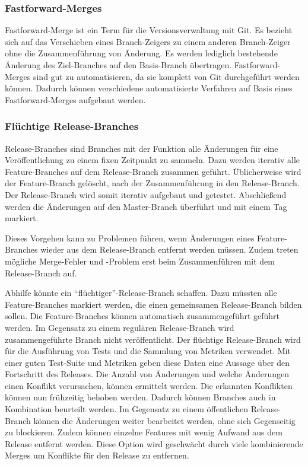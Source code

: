 \subsubsection{Fastforward-Merges}

Fastforward-Merge ist ein Term für die Versionsverwaltung mit Git. Es bezieht sich auf das Verschieben eines Branch-Zeigers zu einem anderen Branch-Zeiger ohne die Zusammenführung von Änderung. Es werden lediglich bestehende Änderung des Ziel-Branches auf den Basis-Branch übertragen.
Fastforward-Merges sind gut zu automatisieren, da sie komplett von Git durchgeführt werden können. Dadurch können verschiedene automatisierte Verfahren auf Basis eines Fastforward-Merges aufgebaut werden.

\subsubsection{Flüchtige Release-Branches}

Release-Branches sind Branches mit der Funktion alle Änderungen für eine Veröffentlichung zu einem fixen Zeitpunkt zu sammeln. Dazu werden iterativ alle Feature-Branches auf dem Release-Branch zusammen geführt. Üblicherweise wird der Feature-Branch gelöscht, nach der Zusammenführung in den Release-Branch. Der Release-Branch wird somit iterativ aufgebaut und getestet. Abschließend werden die Änderungen auf den Master-Branch überführt und mit einem Tag markiert.

Dieses Vorgehen kann zu Problemen führen, wenn Änderungen eines Feature-Branches wieder aus dem Release-Branch entfernt werden müssen. Zudem treten mögliche Merge-Fehler und -Problem erst beim Zusammenführen mit dem Release-Branch auf.

Abhilfe könnte ein ``flüchtiger''-Release-Branch schaffen. Dazu müssten alle Feature-Branches markiert werden, die einen gemeinsamen Release-Branch bilden sollen. Die Feature-Branches können automatisch zusammengeführt geführt werden. Im Gegensatz zu einem regulären Release-Branch wird zusammengeführte Branch nicht veröffentlicht. Der flüchtige Release-Branch wird für die Ausführung von Tests und die Sammlung von Metriken verwendet. Mit einer guten Test-Suite und Metriken geben diese Daten eine Aussage über den Fortschritt des Releases. Die Anzahl von Änderungen und welche Änderungen einen Konflikt verursachen, können ermittelt werden. Die erkannten Konflikten können nun frühzeitig behoben werden. Dadurch können Branches auch in Kombination beurteilt werden. Im Gegensatz zu einem öffentlichen Release-Branch können die Änderungen weiter bearbeitet werden, ohne sich Gegenseitig zu blockieren. Zudem können einzelne Features mit wenig Aufwand aus dem Release entfernt werden. Diese Option wird geschwächt durch viele kombinierende Merges um Konflikte für den Release zu entfernen.

